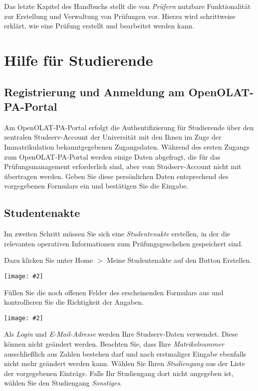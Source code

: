 \documentclass[a4paper,11pt]{article}
\newcommand{\bild}[2]{
    \begin{center}\texttt{[image: \#2]}\end{center}
}
\newcommand{\knopf}[1]{{\sc #1}}
\begin{document}
Das letzte Kapitel des Handbuchs stellt die von {\em Prüfern}
nutzbare Funktionalität zur Erstellung und Verwaltung von Prüfungen vor.
Hierzu wird schrittweise erklärt, wie eine Prüfung erstellt und bearbeitet
werden kann.

\clearpage
\section{Hilfe für Studierende}

\subsection{Registrierung und Anmeldung am OpenOLAT-PA-Portal}

Am OpenOLAT-PA-Portal erfolgt die Authentifizierung für Studierende über den
zentralen Studserv-Account der Universität mit den Ihnen im Zuge der
Immatrikulation bekanntgegebenen Zugangsdaten.  Während des ersten Zugangs zum
OpenOLAT-PA-Portal werden einige Daten abgefragt, die für das Prüfungsmanagement
erforderlich sind, aber vom Studserv-Account nicht mit übertragen werden.
Geben Sie diese persönlichen Daten entsprechend des vorgegebenen Formulars ein
und bestätigen Sie die Eingabe.

\subsection{Studentenakte}

Im zweiten Schritt müssen Sie sich eine {\em Studentenakte}
erstellen, in der die relevanten operativen Informationen zum
Prüfungsgeschehen gespeichert sind. 

Dazu klicken Sie unter \knopf{Home $>$ Meine Studentenakte} auf den Button
\knopf{Erstellen}.

\bild{1}{ESA-Erstellen}

Füllen Sie die noch offenen Felder des erscheinenden Formulars aus und
kontrollieren Sie die Richtigkeit der Angaben.

\bild{1}{ESA-Eingaben}

Als {\em Login} und {\em E-Mail-Adresse} werden Ihre Studserv-Daten verwendet.
Diese können nicht geändert werden. Beachten Sie, dass Ihre {\em Matrikelnummer}
ausschließlich aus Zahlen bestehen darf und nach erstmaliger Eingabe ebenfalls
nicht mehr geändert werden kann. Wählen Sie Ihren {\em Studiengang}
aus der Liste der vorgegebenen Einträge.  Falls Ihr Studiengang dort nicht
angegeben ist, wählen Sie den Studiengang {\em Sonstiges}.
\end{document}

